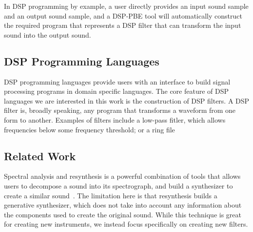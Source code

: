 In DSP programming by example, a user directly provides an input sound sample and an output sound sample, and a DSP-PBE tool will automatically construct the required program that represents a DSP filter that can transform the input sound into the output sound.

\iffalse

\subsection{Program Synthesis}
Programming by example, and program synthesis more generally, has experienced an explosion of research and progress in the last 15 years within the formal logic research community.
This has led to real world applications, such as FlashFill, a programming by example plugin for Microsoft Excel~\cite{Gulwani2011}.

\fi

\subsection{DSP Programming Languages}

DSP programming languages provide users with an interface to build signal processing programs in domain specific languages.
The core feature of DSP languages we are interested in this work is the construction of DSP filters.
A DSP filter is, broadly speaking, any program that transforms a waveform from one form to another.
Examples of filters include a low-pass fitler, which allows frequencies below some frequency threshold; or a ring file


\subsection{Related Work}

Spectral analysis and resynthesis is a powerful combination of tools that allows users to decompose a sound into its spectrograph, and build a synthesizer to create a similar sound~\cite{?}.
The limitation here is that resynthesis builds a generative synthesizer, which does not take into account any information about the components used to create the original sound.
While this technique is great for creating new instruments, we instead focus specifically on creating new filters.
